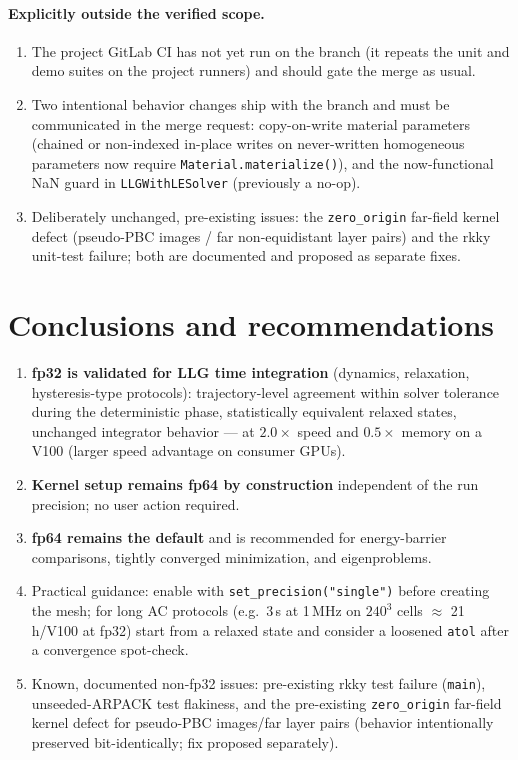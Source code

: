 \documentclass[11pt,a4paper]{article}
\begin{document}
\paragraph{Explicitly outside the verified scope.}
\begin{enumerate}
\item The project GitLab CI has not yet run on the branch (it repeats the unit
      and demo suites on the project runners) and should gate the merge as usual.
\item Two intentional behavior changes ship with the branch and must be
      communicated in the merge request: copy-on-write material parameters
      (chained or non-indexed in-place writes on never-written homogeneous
      parameters now require \texttt{Material.materialize()}), and the
      now-functional NaN guard in \texttt{LLGWithLESolver} (previously a no-op).
\item Deliberately unchanged, pre-existing issues: the \texttt{zero\_origin}
      far-field kernel defect (pseudo-PBC images / far non-equidistant layer
      pairs) and the rkky unit-test failure; both are documented and proposed
      as separate fixes.
\end{enumerate}

\section{Conclusions and recommendations}
\label{sec:conclusions}

\begin{enumerate}
\item \textbf{fp32 is validated for LLG time integration} (dynamics, relaxation,
      hysteresis-type protocols): trajectory-level agreement within solver
      tolerance during the deterministic phase, statistically equivalent relaxed
      states, unchanged integrator behavior --- at $2.0\times$ speed and
      $0.5\times$ memory on a V100 (larger speed advantage on consumer GPUs).
\item \textbf{Kernel setup remains fp64 by construction} independent of the run
      precision; no user action required.
\item \textbf{fp64 remains the default} and is recommended for energy-barrier
      comparisons, tightly converged minimization, and eigenproblems.
\item Practical guidance: enable with \texttt{set\_precision("single")} before
      creating the mesh; for long AC protocols (e.g.\ 3\,\textmu s at 1\,MHz on
      $240^3$ cells $\approx$ 21\,h/V100 at fp32) start from a relaxed state and
      consider a loosened \texttt{atol} after a convergence spot-check.
\item Known, documented non-fp32 issues: pre-existing rkky test failure
      (\texttt{main}), unseeded-ARPACK test flakiness, and the pre-existing
      \texttt{zero\_origin} far-field kernel defect for pseudo-PBC images/far
      layer pairs (behavior intentionally preserved bit-identically; fix
      proposed separately).
\end{enumerate}
\end{document}
